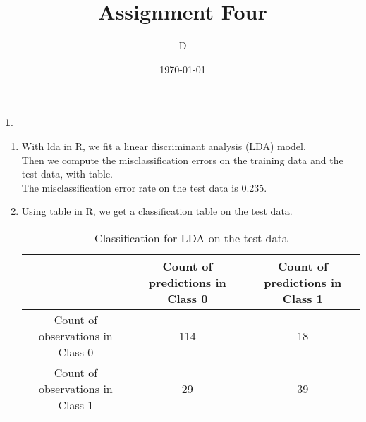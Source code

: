 \documentclass[10pt]{article}
\author{D}
\newtheorem{prob}{\bm{$Problem$}}
\begin{document}
\title{Assignment Four}
\date{\today}
\maketitle
\thispagestyle{fancy}

\newpage

\begin{prob}
\end{prob}
\begin{enumerate}[1)]
\vspace{3mm}

\item
With {\ttfamily lda} in R, we fit a linear discriminant analysis (LDA) model.\\
Then we compute the misclassification errors on the training data and the test data, with {\ttfamily table}.\\
The misclassification error rate on the test data is 0.235.

\item
Using {\ttfamily table} in R, we get a classification table on the test data.\\
\begin{comment}
\begin{table}[H]
\centering
\small
\begin{tabular}{|c|cc|}
\hline
                                 & Count of predictions in Class 0 & Count of predictions in Class 1 \\ \hline
Count of observations in Class 0 & 198                             & 25                              \\
Count of observations in Class 1 & 46                              & 63                              \\ \hline
\end{tabular}
\caption{Classification for LDA on the training data}
\end{table}
\end{comment}
\begin{table}[H]
\centering
\small
\begin{tabular}{|c|cc|}
\hline
                                 & Count of predictions in Class 0 & Count of predictions in Class 1 \\ \hline
Count of observations in Class 0 & 114                             & 18                              \\
Count of observations in Class 1 & 29                              & 39                              \\ \hline
\end{tabular}
\caption{Classification for LDA on the test data}
\end{table}


\end{enumerate}
\end{document}
